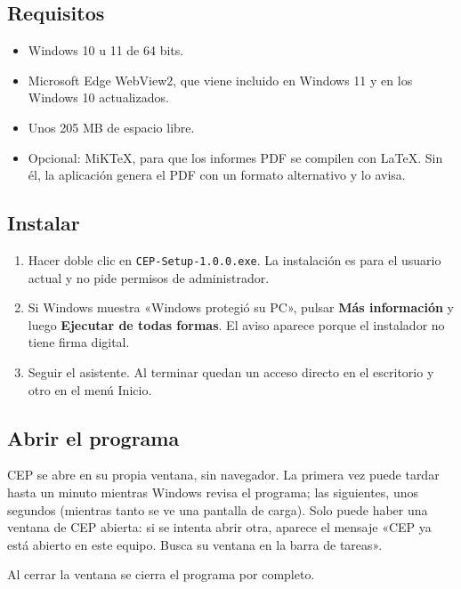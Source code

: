 \documentclass[11pt,a4paper]{article}
\newcommand{\boton}[1]{\textbf{#1}}                      %
\newcommand{\campo}[1]{«#1»}                             %
\begin{document}
\subsection{Requisitos}
\begin{itemize}
\item Windows 10 u 11 de 64 bits.
\item Microsoft Edge WebView2, que viene incluido en Windows 11 y en los Windows 10 actualizados.
\item Unos 205 MB de espacio libre.
\item Opcional: MiKTeX, para que los informes PDF se compilen con LaTeX. Sin él, la aplicación
  genera el PDF con un formato alternativo y lo avisa.
\end{itemize}

\subsection{Instalar}
\begin{enumerate}
\item Hacer doble clic en \texttt{CEP-Setup-1.0.0.exe}. La instalación es para el usuario actual
  y no pide permisos de administrador.
\item Si Windows muestra \campo{Windows protegió su PC}, pulsar \boton{Más información} y luego
  \boton{Ejecutar de todas formas}. El aviso aparece porque el instalador no tiene firma digital.
\item Seguir el asistente. Al terminar quedan un acceso directo en el escritorio y otro en el menú
  Inicio.
\end{enumerate}

\subsection{Abrir el programa}
CEP se abre en su propia ventana, sin navegador. La primera vez puede tardar hasta un minuto
mientras Windows revisa el programa; las siguientes, unos segundos (mientras tanto se ve una
pantalla de carga). Solo puede haber una ventana de CEP abierta: si se intenta abrir otra, aparece
el mensaje \campo{CEP ya está abierto en este equipo. Busca su ventana en la barra de tareas}.

Al cerrar la ventana se cierra el programa por completo.
\end{document}
